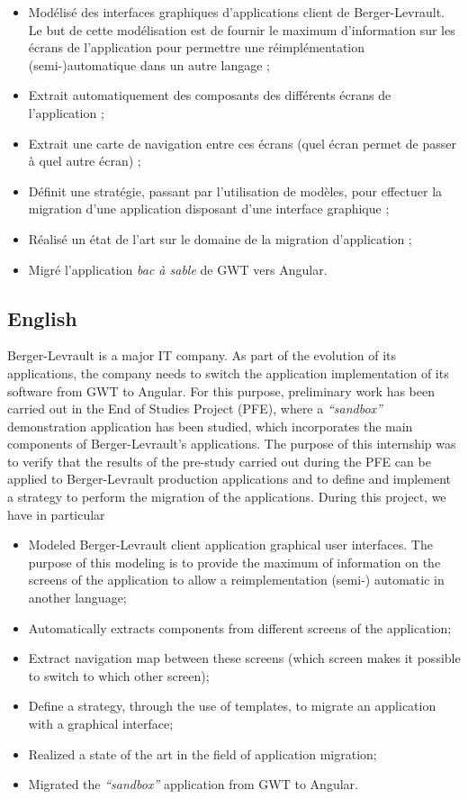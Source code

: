 \begin{itemize}
\tightlist
\item
  Modélisé des interfaces graphiques d'applications client de
  Berger-Levrault. Le but de cette modélisation est de fournir le
  maximum d'information sur les écrans de l'application pour permettre
  une réimplémentation (semi-)automatique dans un autre langage ;
\item
  Extrait automatiquement des composants des différents écrans de
  l'application ;
\item
  Extrait une carte de navigation entre ces écrans (quel écran permet de
  passer à quel autre écran) ;
\item
  Définit une stratégie, passant par l'utilisation de modèles, pour
  effectuer la migration d'une application disposant d'une interface
  graphique ;
\item
  Réalisé un état de l'art sur le domaine de la migration d'application
  ;
\item
  Migré l'application \emph{bac à sable} de GWT vers Angular.
\end{itemize}

\hypertarget{english}{%
\subsection{English}\label{english}}

Berger-Levrault is a major IT company. As part of the evolution of its
applications, the company needs to switch the application implementation
of its software from GWT to Angular. For this purpose, preliminary work
has been carried out in the End of Studies Project (PFE), where a
\emph{``sandbox''} demonstration application has been studied, which
incorporates the main components of Berger-Levrault's applications. The
purpose of this internship was to verify that the results of the
pre-study carried out during the PFE can be applied to Berger-Levrault
production applications and to define and implement a strategy to
perform the migration of the applications. During this project, we have
in particular

\begin{itemize}
\tightlist
\item
  Modeled Berger-Levrault client application graphical user interfaces.
  The purpose of this modeling is to provide the maximum of information
  on the screens of the application to allow a reimplementation (semi-)
  automatic in another language;
\item
  Automatically extracts components from different screens of the
  application;
\item
  Extract navigation map between these screens (which screen makes it
  possible to switch to which other screen);
\item
  Define a strategy, through the use of templates, to migrate an
  application with a graphical interface;
\item
  Realized a state of the art in the field of application migration;
\item
  Migrated the \emph{``sandbox''} application from GWT to Angular.
\end{itemize}
